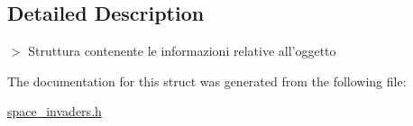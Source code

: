 \subsection{Detailed Description}
$>$ Struttura contenente le informazioni relative all'oggetto 

The documentation for this struct was generated from the following file:\begin{DoxyCompactItemize}
\item 
\hyperlink{space__invaders_8h}{space\_\-invaders.h}\end{DoxyCompactItemize}
